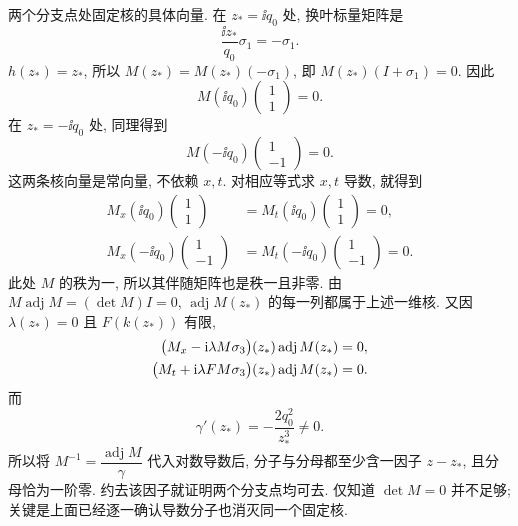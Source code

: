 \par\smallskip\noindent 两个分支点处固定核的具体向量.\quad
在 $z_* =\ii q_0$ 处, 换叶标量矩阵是
\begin{equation*}
\dfrac{\ii z_*}{q_0}\sigma_1=-\sigma_1.
\end{equation*}
$h(z_*)=z_*$, 所以 $M(z_*)=M(z_*)(-\sigma_1)$,
即 $M(z_*)(I+\sigma_1)=0$.
因此
\begin{equation*}
M(\ii q_0)\begin{pmatrix}1\\1\end{pmatrix}=0.
\end{equation*}
在 $z_*=-\ii q_0$ 处, 同理得到
\begin{equation*}
M(-\ii q_0)\begin{pmatrix}1\\-1\end{pmatrix}=0.
\end{equation*}
这两条核向量是常向量, 不依赖 $x,t$.
对相应等式求 $x,t$ 导数, 就得到
\begin{equation*}
\begin{aligned}
M_x(\ii q_0)\begin{pmatrix}1\\1\end{pmatrix}
&=M_t(\ii q_0)\begin{pmatrix}1\\1\end{pmatrix}=0,\\
M_x(-\ii q_0)\begin{pmatrix}1\\-1\end{pmatrix}
&=M_t(-\ii q_0)\begin{pmatrix}1\\-1\end{pmatrix}=0.
\end{aligned}
\end{equation*}
此处 $M$ 的秩为一, 所以其伴随矩阵也是秩一且非零.
由 $M\operatorname{adj}M=(\det M)I=0$,
$\operatorname{adj}M(z_*)$ 的每一列都属于上述一维核.
又因 $\lambda(z_*)=0$ 且 $F(k(z_*))$ 有限,
\begin{equation*}
\begin{aligned}
\bigl(M_x-\mathrm{i}\lambda M\sigma_3\bigr)(z_*)
\operatorname{adj}M(z_*)&=0,\\
\bigl(M_t+\mathrm{i}\lambda F M\sigma_3\bigr)(z_*)
\operatorname{adj}M(z_*)&=0.
\end{aligned}
\end{equation*}
而
\begin{equation*}
\gamma'(z_*)=-\dfrac{2q_0^2}{z_*^3}\ne0.
\end{equation*}
所以将 $M^{-1}=\dfrac{\operatorname{adj}M}{\gamma}$ 代入对数导数后,
分子与分母都至少含一因子 $z-z_*$, 且分母恰为一阶零.
约去该因子就证明两个分支点均可去.
仅知道 $\det M=0$ 并不足够;
关键是上面已经逐一确认导数分子也消灭同一个固定核.

